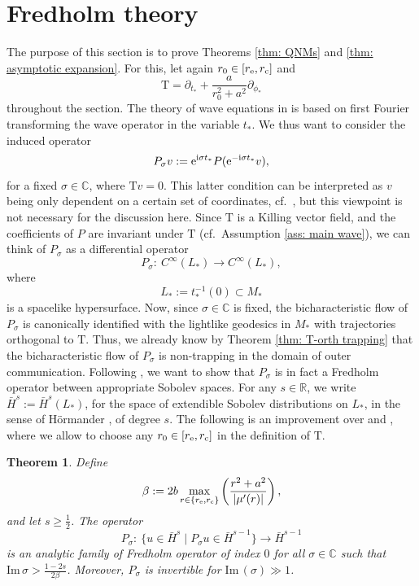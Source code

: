\documentclass[pdftex]{sigma}
\renewcommand{\Im}{\mathrm{Im} \,}
\renewcommand{\b}{\beta}
\renewcommand{\d}{\partial}
\newcommand{\abs}[1]{\left\lvert#1\right\rvert}
\newcommand{\T}{\mathrm T}
\newcommand{\s}{\sigma}
\newcommand{\R}[0]{\mathbb{R}}
\newcommand{\C}[0]{\mathbb{C}}
\numberwithin{equation}{section}
\newtheorem{Theorem}{Theorem}[section]
\begin{document}
\section{Fredholm theory}


The purpose of this section is to prove Theorems \ref{thm: QNMs} and \ref{thm: asymptotic expansion}.
For this, let again $r_0 \in [r_{\rm e}, r_{\rm c}]$
and
\[
	\T
		= \d_{t_*} + \frac a{r_0^2 + a^2} \d_{\phi_*}
\]
throughout the section.
The theory of wave equations in \cite{V2013} is based on first Fourier transforming the wave operator in the variable $t_*$.
We thus want to consider the induced operator
\[
	P_\s v
		:= {\rm e}^{{\rm i}\s t_*} P({\rm e}^{-{\rm i} \s t_*} v),
\]
for a fixed $\s \in \C$, where
$\T v
		= 0$.
This latter condition can be interpreted as $v$ being only dependent on a certain set of coordinates, cf.\ \cite[equation~(11)]{PV2023}, but this viewpoint is not necessary for the discussion here.
Since $\T$ is a Killing vector field, and the coefficients of $P$ are invariant under $\T$ (cf.~Assumption \ref{ass: main wave}), we can think of $P_\s$ as a differential operator
\[
	P_\s
		\colon\
 C^\infty(L_*) \to C^\infty(L_*),
\]
where
\[
	L_*
		:= t_*^{-1}(0) \subset M_*
\]
is a spacelike hypersurface.
Now, since $\s \in \C$ is fixed, the bicharacteristic flow of $P_\s$ is canonically identified with the lightlike geodesics in $M_*$ with trajectories orthogonal to $\T$.
Thus, we already know by Theorem \ref{thm: T-orth trapping} that the bicharacteristic flow of $P_\s$ is non-trapping in the domain of outer communication.
Following \cite{V2013}, we want to show that $P_\s$ is in fact a Fredholm operator between appropriate Sobolev spaces.
For any $s \in \R$, we write
$ \bar H^s := \bar H^s(L_*)$,
for the space of extendible Sobolev distributions on $L_*$, in the sense of H\"ormander \cite{HorIII}, of degree $s$.
The following is an improvement over \cite[Lemma~2.1]{PV2023} and \cite[Theorem~1.1]{V2013}, where we allow to choose any $r_0 \in [r_{\rm e}, r_{\rm c}]$ in the definition of $\T$.

\begin{Theorem} \label{thm: Fredholm}
Define
\[
	\b
		:= 2b \max_{r \in \{r_{\rm e}, r_{\rm c}\}} \left( \frac{r^2 + a^2}{\abs{\mu'(r)}} \right),
\]
and let $s \geq \frac12$.
The operator
\[
  P_\s\colon\ \big\{u \in \bar H^s \mid P_\s u \in \bar H^{s-1} \big\} \to \bar H^{s-1}
\]
is an analytic family of Fredholm operator of index $0$ for all $\s \in \C$ such that $\Im \s > \frac{1 - 2s}{2\b}$.
Moreover, $P_\s$ is invertible for $\Im(\s) \gg 1$.
\end{Theorem}
\end{document}
